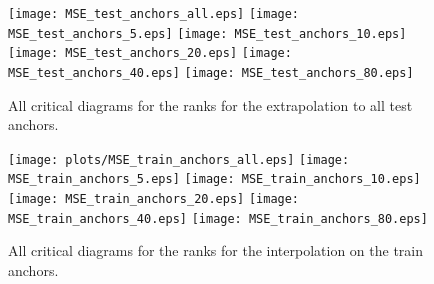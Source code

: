 \documentclass{article}
\begin{document}
\begin{figure}[h]
    \centering
    \texttt{[image: MSE\_test\_anchors\_all.eps]}
    \texttt{[image: MSE\_test\_anchors\_5.eps]}
    \texttt{[image: MSE\_test\_anchors\_10.eps]}
    \texttt{[image: MSE\_test\_anchors\_20.eps]}
    \texttt{[image: MSE\_test\_anchors\_40.eps]}
    \texttt{[image: MSE\_test\_anchors\_80.eps]}
    \caption{All critical diagrams for the ranks for the extrapolation to all test anchors. }
\end{figure}

\begin{figure}[h]
    \centering
    \texttt{[image: plots/MSE\_train\_anchors\_all.eps]}
    \texttt{[image: MSE\_train\_anchors\_5.eps]}
    \texttt{[image: MSE\_train\_anchors\_10.eps]}
    \texttt{[image: MSE\_train\_anchors\_20.eps]}    \texttt{[image: MSE\_train\_anchors\_40.eps]}
    \texttt{[image: MSE\_train\_anchors\_80.eps]}
    \caption{All critical diagrams for the ranks for the interpolation on the train anchors.  }
\end{figure}

\FloatBarrier
\end{document}
